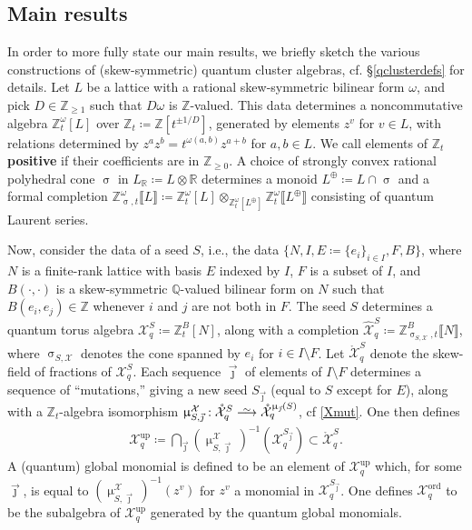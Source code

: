 \documentclass{amsart}
\DeclareMathOperator{\up}{up}
\DeclareMathOperator{\ord}{ord}
\let\llb=\llbracket
\let\rrb=\rrbracket
\let\bb=\mathbb
\let\s=\mathcal
\let\wh=\widehat
\let\mr=\mathring
\def\risom{\buildrel\sim\over{\smashedlongrightarrow}}
\def\smashedlongrightarrow{\setbox0=\hbox{$\longrightarrow$}\ht0=1.25pt\box0}
\newcommand {\Zt} {\Z_t}
\newcommand {\jj} {\vec{\jmath}}
\renewcommand{\sigma}{\upsigma}
\renewcommand{\mu}{\upmu}
\theoremstyle{plain}%
\newcommand{\Z}{{\mathbb Z}}
\theoremstyle{definition}
\theoremstyle{remark}
\begin{document}
\subsection{Main results}\label{MainResultsSection}

In order to more fully state our main results, we briefly sketch the various constructions of (skew-symmetric) quantum cluster algebras, cf. \S \ref{qclusterdefs} for details.   
Let $L$ be a lattice with a rational skew-symmetric bilinear form $\omega$, and pick $D\in \bb{Z}_{\geq 1}$ such that $D\omega$ is $\bb{Z}$-valued.  This data determines a noncommutative algebra $\Z_t^{\omega}[L]$ over $\Zt \coloneqq\Z[t^{\pm 1/D}]$, generated by elements $z^v$ for $v\in L$, with relations determined by $z^{a}z^{b}=t^{\omega(a,b)}z^{a+b}$ for $a,b\in L$.  We call elements of $\Zt$ \textbf{positive} if their coefficients are in $\bb{Z}_{\geq 0}$.  A choice of strongly convex rational polyhedral cone $\sigma$ in $L_{\bb{R}}\coloneqq L\otimes \bb{R}$ determines a monoid $L^{\oplus}\coloneqq L\cap \sigma$ and a formal completion $\Z_{\sigma,t}^{\omega}\llb L\rrb\coloneqq \Z_t^{\omega}[L]\otimes_{\Z_t^{\omega}[L^{\oplus}]}\Z_t^{\omega}\llb L^{\oplus}\rrb$ consisting of quantum Laurent series. 


Now, consider the data of a seed $S$, i.e., the data $\{N,I,E\coloneqq \{e_{i}\}_{i\in I},F,B\}$, where $N$ is a finite-rank lattice with basis $E$ indexed by $I$, $F$ is a subset of $I$, and $B(\cdot,\cdot)$ is a skew-symmetric $\bb{Q}$-valued bilinear form on $N$ such that $B(e_i,e_j)\in \bb{Z}$ whenever $i$ and $j$ are not both in $F$.  The seed $S$ determines a quantum torus algebra $\s{X}_q^S\coloneqq \Z^B_t[N]$, along with a completion $\wh{\s{X}}_q^S\coloneqq \Z_{\sigma_{S,\s{X}},t}^B\llb N\rrb$, where $\sigma_{S,\s{X}}$ denotes the cone spanned by $e_i$ for $i\in I\setminus F$.  Let $\mr{\s{X}}_q^S$ denote the skew-field of fractions of $\s{X}_q^S$.  Each sequence $\jj$ of elements of $I\setminus F$ determines a sequence of ``mutations,'' giving a new seed $S_{\jj}$ (equal to $S$ except for $E$), along with a $\Zt$-algebra isomorphism $\mu_{S,\jj}^{\s{X}}:\mr{\s{X}}_q^S\risom \mr{\s{X}}_q^{\mu_{\jj}(S)}$, cf \eqref{Xmut}.  One then defines
\begin{align*}
    \s{X}_q^{\up} \coloneqq \bigcap_{\jj} (\mu_{S,\jj}^{\s{X}})^{-1}(\s{X}_q^{S_{\jj}})\subset \mr{\s{X}}_q^S.
\end{align*}
A (quantum) global monomial is defined to be an element of $\s{X}_q^{\up}$ which, for some $\jj$, is equal to $(\mu_{S,\jj}^{\s{X}})^{-1}(z^v)$ for $z^v$ a monomial in $\s{X}_q^{S_{\jj}}$. One defines $\s{X}_q^{\ord}$ to be the subalgebra of $\s{X}_q^{\up}$ generated by the quantum global monomials.
\end{document}
